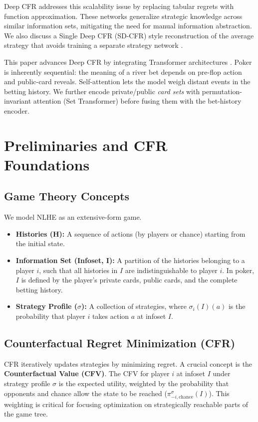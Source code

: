 \documentclass[11pt,a4paper]{article}
\begin{document}
Deep CFR \cite{brown2018deep} addresses this scalability issue by replacing tabular regrets with function approximation. These networks generalize strategic knowledge across similar information sets, mitigating the need for manual information abstraction. We also discuss a Single Deep CFR (SD-CFR) style reconstruction of the average strategy that avoids training a separate strategy network \cite{steinberger2019sdcfr}.

This paper advances Deep CFR by integrating Transformer architectures \cite{vaswani2017attention}. Poker is inherently sequential: the meaning of a river bet depends on pre-flop action and public-card reveals. Self-attention lets the model weigh distant events in the betting history. We further encode private/public \emph{card sets} with permutation-invariant attention (Set Transformer) \cite{lee2019settransformer} before fusing them with the bet-history encoder.

\section{Preliminaries and CFR Foundations}

\subsection{Game Theory Concepts}

We model NLHE as an extensive-form game.
\begin{itemize}
    \item \textbf{Histories (H):} A sequence of actions (by players or chance) starting from the initial state.
    \item \textbf{Information Set (Infoset, I):} A partition of the histories belonging to a player $i$, such that all histories in $I$ are indistinguishable to player $i$. In poker, $I$ is defined by the player's private cards, public cards, and the complete betting history.
    \item \textbf{Strategy Profile ($\sigma$):} A collection of strategies, where $\sigma_i(I)(a)$ is the probability that player $i$ takes action $a$ at infoset $I$.
\end{itemize}

\subsection{Counterfactual Regret Minimization (CFR)}

CFR iteratively updates strategies by minimizing regret. A crucial concept is the \textbf{Counterfactual Value (CFV)}. The CFV for player $i$ at infoset $I$ under strategy profile $\sigma$ is the expected utility, weighted by the probability that opponents and chance allow the state to be reached ($\pi_{-i,\text{chance}}^\sigma(I)$). This weighting is critical for focusing optimization on strategically reachable parts of the game tree.
\end{document}
